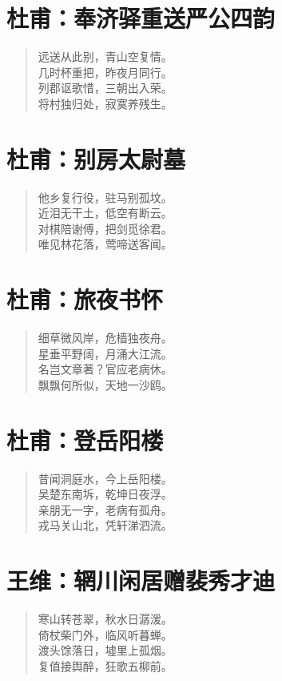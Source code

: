 \documentclass[12pt,oneside]{book}
\newenvironment{shici}{%
\begin{verse}\centering\yanti\large\hspace{12pt}}{\end{verse}}
\begin{document}
\begin{common-format}
\chapter{杜甫：奉济驿重送严公四韵}
\begin{shici}
远送从此别，青山空复情。\\
几时杯重把，昨夜月同行。\\
列郡讴歌惜，三朝出入荣。\\
将村独归处，寂寞养残生。
\end{shici}

\chapter{杜甫：别房太尉墓}
\begin{shici}
他乡复行役，驻马别孤坟。\\
近泪无干土，低空有断云。\\
对棋陪谢傅，把剑觅徐君。\\
唯见林花落，莺啼送客闻。
\end{shici}

\chapter{杜甫：旅夜书怀}
\begin{shici}
细草微风岸，危樯独夜舟。\\
星垂平野阔，月涌大江流。\\
名岂文章著？官应老病休。\\
飘飘何所似，天地一沙鸥。
\end{shici}

\chapter{杜甫：登岳阳楼}
\begin{shici}
昔闻洞庭水，今上岳阳楼。\\
吴楚东南坼，乾坤日夜浮。\\
亲朋无一字，老病有孤舟。\\
戎马关山北，凭轩涕泗流。
\end{shici}

\chapter{王维：辋川闲居赠裴秀才迪}
\begin{shici}
寒山转苍翠，秋水日潺湲。\\
倚杖柴门外，临风听暮蝉。\\
渡头馀落日，墟里上孤烟。\\
复值接舆醉，狂歌五柳前。
\end{shici}


\end{common-format}
\end{document}

